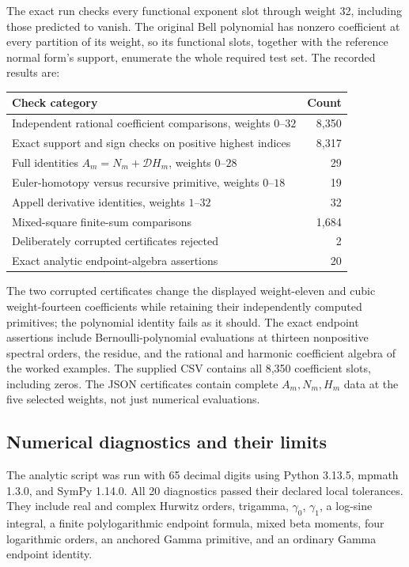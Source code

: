 \documentclass[11pt,letterpaper]{article}
\numberwithin{equation}{section}
\theoremstyle{definition}\newtheorem{definition}[theorem]{Definition}
\theoremstyle{remark}\newtheorem{remark}[theorem]{Remark}
\newcommand{\D}{\mathcal D}\newcommand{\NF}{\mathcal N}\newcommand{\HF}{\mathcal H}
\begin{document}
The exact run checks every functional exponent slot through weight 32,
including those predicted to vanish. The original Bell polynomial has
nonzero coefficient at every partition of its weight, so its functional
slots, together with the reference normal form's support, enumerate the
whole required test set. The recorded results are:
\begin{center}
\begin{tabular}{lr}
\toprule
Check category&Count\\
\midrule
Independent rational coefficient comparisons, weights $0$--$32$&8,350\\
Exact support and sign checks on positive highest indices&8,317\\
Full identities $A_m=N_m+\D H_m$, weights $0$--$28$&29\\
Euler-homotopy versus recursive primitive, weights $0$--$18$&19\\
Appell derivative identities, weights $1$--$32$&32\\
Mixed-square finite-sum comparisons&1,684\\
Deliberately corrupted certificates rejected&2\\
Exact analytic endpoint-algebra assertions&20\\
\bottomrule
\end{tabular}
\end{center}
The two corrupted certificates change the displayed weight-eleven and
cubic weight-fourteen coefficients while retaining their independently
computed primitives; the polynomial identity fails as it should.
The exact endpoint assertions include Bernoulli-polynomial evaluations
at thirteen nonpositive spectral orders, the residue, and the rational
and harmonic coefficient algebra of the worked examples.
The supplied CSV contains all 8,350 coefficient slots, including zeros.
The JSON certificates contain complete $A_m,N_m,H_m$ data at the five
selected weights, not just numerical evaluations.

\subsection{Numerical diagnostics and their limits}
The analytic script was run with 65 decimal digits using Python 3.13.5,
mpmath 1.3.0, and SymPy 1.14.0. All 20 diagnostics passed their declared
local tolerances. They include real and complex Hurwitz orders,
trigamma, $\gamma_0$, $\gamma_1$, a log-sine integral, a finite
polylogarithmic endpoint formula, mixed beta moments, four logarithmic
orders, an anchored Gamma primitive, and an ordinary Gamma endpoint
identity.
\end{document}

